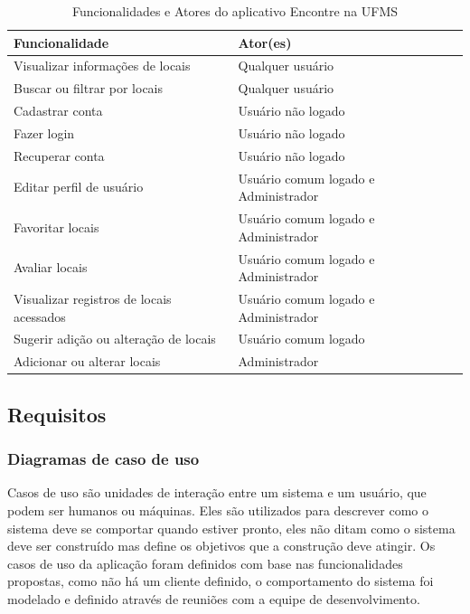     \begin{table}[h]
        \begin{tabularx}{\textwidth}{|X|X|}
            \hline
            \textbf{Funcionalidade} & \textbf{Ator(es)} \\ \hline
            Visualizar informações de locais & Qualquer usuário \\ \hline
            Buscar ou filtrar por locais & Qualquer usuário \\ \hline
            Cadastrar conta & Usuário não logado \\ \hline
            Fazer login & Usuário não logado \\ \hline
            Recuperar conta & Usuário não logado \\ \hline
            Editar perfil de usuário & Usuário comum logado e Administrador \\ \hline
            Favoritar locais & Usuário comum logado e Administrador \\ \hline
            Avaliar locais & Usuário comum logado e Administrador \\ \hline
            Visualizar registros de locais acessados & Usuário comum logado e Administrador \\ \hline
            Sugerir adição ou alteração de locais & Usuário comum logado \\ \hline
            Adicionar ou alterar locais & Administrador \\ \hline
        \end{tabularx}
        \caption{Funcionalidades e Atores do aplicativo Encontre na UFMS}
        \label{tab:funcionalidades-atores}
    \end{table}
    \FloatBarrier
\subsection{Requisitos}
\subsubsection{Diagramas de caso de uso}

    Casos de uso são unidades de interação entre um sistema e um usuário, que podem ser humanos ou máquinas. Eles são utilizados para descrever como o sistema deve se comportar quando estiver pronto, eles não ditam como o sistema deve ser construído mas define os objetivos que a construção deve atingir. Os casos de uso da aplicação foram definidos com base nas funcionalidades propostas, como não há um cliente definido, o comportamento do sistema foi modelado e definido através de reuniões com a equipe de desenvolvimento.


